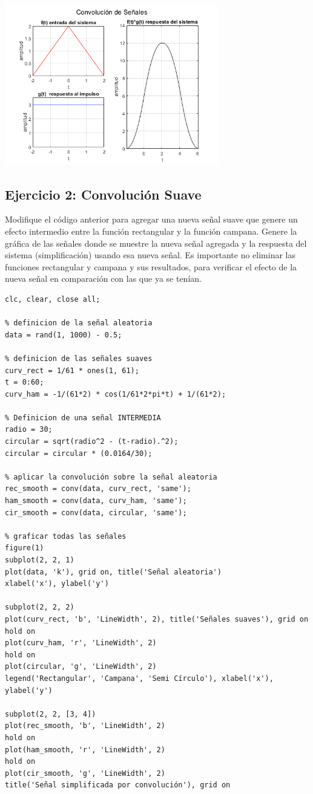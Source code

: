 \documentclass{article}
\begin{document}
\begin{minipage}{\linewidth}
  \centering
  \includegraphics[width=0.7\textwidth]{imgs/p1.png}
  \label{referenciarImagenAca}
\end{minipage}

\subsection*{Ejercicio 2: Convolución Suave}
Modifique el código anterior para agregar una nueva señal suave que genere un efecto intermedio entre la función rectangular y la función campana. Genere la gráfica de las señales donde se muestre la nueva señal agregada y la respuesta del sistema (simplificación) usando esa nueva señal. Es importante no eliminar las funciones rectangular y campana y sus resultados, para verificar el efecto de la nueva señal en comparación con las que ya se tenían.

\begin{lstlisting}[style=mystyle]
clc, clear, close all;

% definicion de la señal aleatoria
data = rand(1, 1000) - 0.5;

% definicion de las señales suaves
curv_rect = 1/61 * ones(1, 61);
t = 0:60;
curv_ham = -1/(61*2) * cos(1/61*2*pi*t) + 1/(61*2);

% Definicion de una señal INTERMEDIA
radio = 30;
circular = sqrt(radio^2 - (t-radio).^2);
circular = circular * (0.0164/30);

% aplicar la convolución sobre la señal aleatoria
rec_smooth = conv(data, curv_rect, 'same');
ham_smooth = conv(data, curv_ham, 'same');
cir_smooth = conv(data, circular, 'same');

% graficar todas las señales
figure(1)
subplot(2, 2, 1)
plot(data, 'k'), grid on, title('Señal aleatoria')
xlabel('x'), ylabel('y')

subplot(2, 2, 2)
plot(curv_rect, 'b', 'LineWidth', 2), title('Señales suaves'), grid on
hold on
plot(curv_ham, 'r', 'LineWidth', 2)
hold on
plot(circular, 'g', 'LineWidth', 2)
legend('Rectangular', 'Campana', 'Semi Círculo'), xlabel('x'), ylabel('y')

subplot(2, 2, [3, 4])
plot(rec_smooth, 'b', 'LineWidth', 2)
hold on
plot(ham_smooth, 'r', 'LineWidth', 2)
hold on
plot(cir_smooth, 'g', 'LineWidth', 2)
title('Señal simplificada por convolución'), grid on
\end{lstlisting}
\end{document}

